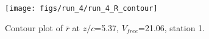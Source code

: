 \begin{figure}[H]
\centering
\texttt{[image: figs/run\_4/run\_4\_R\_contour]}
\caption{Contour plot of $\overline{r}$ at $z/c$=5.37, $V_{free}$=21.06, station 1.}
\label{fig:run_4_R_contour}
\end{figure}


